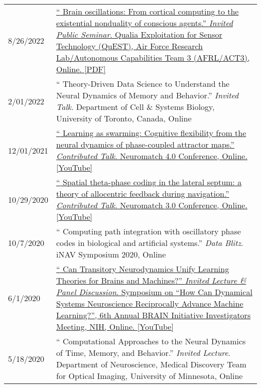 \documentclass[10pt]{article}
\newcommand{\itemtitle}[1]{{\color{hopkinsblue}\ul{#1}}}
\newcommand{\unpubtitle}[1]{{\color{hopkinsblue} #1}}
\begin{document}
\vspace{-.13in}
\begin{longtable}{@{\hspace{0.2in}}l>{\raggedright\arraybackslash}p{}}
  8/26/2022 \hspace{0.3in} &
  \href{https://jdmonaco.com/files/monaco-2022-afrl-quest-slides.pdf}
  {``\unpubtitle{Brain oscillations: From cortical computing to the existential
    nonduality of conscious agents}.'' \emph{Invited Public Seminar}. Qualia
    Exploitation for Sensor Technology (QuEST), Air Force Research Lab/Autonomous
  Capabilities Team 3 (AFRL/ACT3), Online. \itemtitle{[PDF]}}\\
  2/01/2022 \hspace{0.2in} & ``\unpubtitle{Theory-Driven Data Science to
    Understand the Neural Dynamics of Memory and Behavior}.'' \emph{Invited Talk}.
    Department of Cell \& Systems Biology, University of Toronto, Canada, Online \\
  12/01/2021 \hspace{0.2in} &
  \href{https://youtu.be/3mKkLksOyfk}{``\unpubtitle{Learning as swarming:
      Cognitive flexibility from the neural dynamics of phase-coupled attractor
    maps}.'' \emph{Contributed Talk}. Neuromatch 4.0 Conference, Online.
  \itemtitle{[YouTube]}}\\
  10/29/2020 \hspace{0.2in} &
  \href{https://www.youtube.com/watch?v=WwYDMpD7j4Q}{``\unpubtitle{Spatial
      theta-phase coding in the lateral septum: a theory of allocentric feedback
    during navigation}.'' \emph{Contributed Talk}. Neuromatch 3.0 Conference,
  Online. \itemtitle{[YouTube]}}\\
  10/7/2020 \hspace{0.2in} & ``\unpubtitle{Computing path integration with
  oscillatory phase codes in biological and artificial systems}.'' \emph{Data
  Blitz}. iNAV Symposium 2020, Online\\
  6/1/2020 \hspace{0.3in} & \label{sec:symposium}
  \href{https://youtu.be/2jy1ENYHRAw?t=902}{``\unpubtitle{Can Transitory
    Neurodynamics Unify Learning Theories for Brains and Machines?}''
    \emph{Invited Lecture \& Panel Discussion}. Symposium on ``How Can Dynamical
    Systems Neuroscience Reciprocally Advance Machine Learning?'', 6th Annual
  BRAIN Initiative Investigators Meeting, NIH, Online. \itemtitle{[YouTube]}}\\
  5/18/2020 \hspace{0.3in} & ``\unpubtitle{Computational Approaches to the
  Neural Dynamics of Time, Memory, and Behavior}.'' \emph{Invited Lecture}.
  Department of Neuroscience, Medical Discovery Team for Optical Imaging,
  University of Minnesota, Online\\
\end{longtable}
\end{document}
